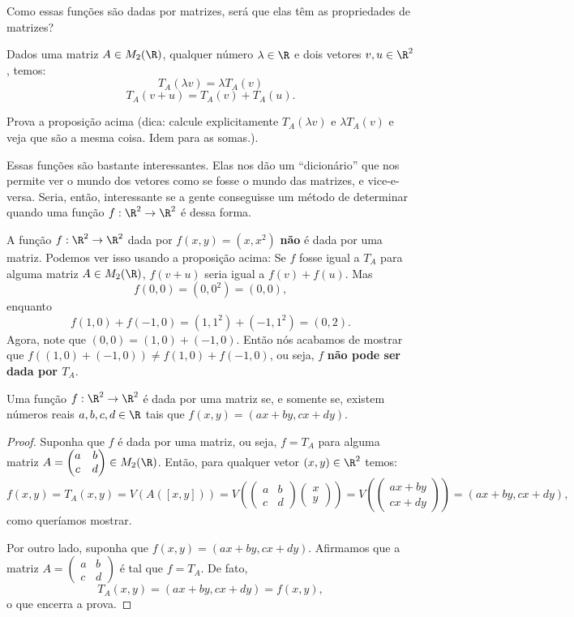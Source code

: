 Como essas funções são dadas por matrizes, será que elas têm as propriedades de matrizes?

\begin{prop}
	Dados uma matriz $A\in M_2(\R)$, qualquer número $\lambda \in \R$ e dois vetores $v,u\in \R^2$, temos:
	\[T_A(\lambda v)=\lambda T_A(v)\]
	\[T_A(v+u)=T_A(v)+T_A(u).\]
\end{prop}

\begin{exerc}
	Prova a proposição acima (dica: calcule explicitamente $T_A(\lambda v)$ e $\lambda T_A(v)$ e veja que são a mesma coisa. Idem para as somas.).
\end{exerc}

Essas funções são bastante interessantes. Elas nos dão um ``dicionário'' que nos permite ver o mundo dos vetores como se fosse o mundo das matrizes, e vice-e-versa. Seria, então, interessante se a gente conseguisse um método de determinar quando uma função $f:\R^2\to \R^2$ é dessa forma. 

\begin{ex}
	A função $f:\R^2\to \R^2$ dada por $f(x,y)=(x,x^2)$ \textbf{não} é dada por uma matriz. Podemos ver isso usando a proposição acima: Se $f$ fosse igual a $T_A$ para alguma matriz $A\in M_2(\R)$, $f(v+u)$ seria igual a $f(v)+f(u)$. Mas
	\[f(0,0)=(0,0^2)=(0,0),\]enquanto
	\[f(1,0)+f(-1,0)=(1,1^2)+(-1,1^2)=(0,2).\] Agora, note que $(0,0)=(1,0)+(-1,0)$. Então nós acabamos de mostrar que $f((1,0)+(-1,0))\neq f(1,0)+f(-1,0)$, ou seja, $f$ \textbf{não pode ser dada por $T_A$}.
\end{ex}

\begin{prop}
	Uma função $f:\R^2 \to \R^2$ é dada por uma matriz se, e somente se, existem números reais $a,b,c,d\in \R$ tais que $f(x,y)=(ax+by,cx+dy)$.
\end{prop}
\begin{proof}
	Suponha que $f$ é dada por uma matriz, ou seja, $f=T_A$ para alguma matriz $A=\begin{pmatrix}
	a&b\\c&d
	\end{pmatrix}\in M_2(\R)$. Então, para qualquer vetor $(x,y)\in \R^2$ temos:
	\[f(x,y)=T_A(x,y)=V(A([x,y]))=V\left(\begin{pmatrix}
	a&b\\c&d
	\end{pmatrix}\begin{pmatrix}
	x\\y
	\end{pmatrix}\right)=V\left(\begin{pmatrix}
	ax+by\\cx+dy
	\end{pmatrix}\right)=(ax+by,cx+dy),\] como queríamos mostrar.
	
	\bigskip
	Por outro lado, suponha que $f(x,y)=(ax+by,cx+dy)$. Afirmamos que a matriz $A=\begin{pmatrix}
	a&b\\c&d
	\end{pmatrix}$ é tal que $f=T_A$. De fato, 
	\[T_A(x,y)=(ax+by,cx+dy)=f(x,y),\]o que encerra a prova.
\end{proof}

